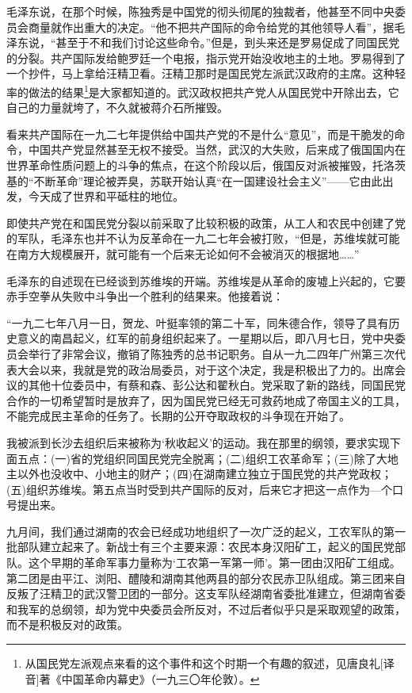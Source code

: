 \documentclass[10pt]{book}
\begin{document}
毛泽东说，在那个时候，陈独秀是中国党的彻头彻尾的独裁者，他甚至不同中央委员会商量就作出重大的决定。“他不把共产国际的命令给党的其他领导人看”，据毛泽东说，“甚至于不和我们讨论这些命令。”但是，到头来还是罗易促成了同国民党的分裂。共产国际发给鲍罗廷一个电报，指示党开始没收地主的土地。罗易得到了一个抄件，马上拿给汪精卫看。汪精卫那时是国民党左派武汉政府的主席。这种轻率的做法的结果\footnote{从国民党左派观点来看的这个事件和这个时期一个有趣的叙述，见唐良礼[译音]著《中国革命内幕史》（一九三〇年伦敦）。}是大家都知道的。武汉政权把共产党人从国民党中开除出去，它自己的力量就垮了，不久就被蒋介石所摧毁。

看来共产国际在一九二七年提供给中国共产党的不是什么“意见”，而是干脆发的命令，中国共产党显然甚至无权不接受。当然，武汉的大失败，后来成了俄国国内在世界革命性质问题上的斗争的焦点，在这个阶段以后，俄国反对派被摧毁，托洛茨基的“不断革命”理论被弄臭，苏联开始认真“在一国建设社会主义”——它由此出发，今天成了世界和平砥柱的地位。

即使共产党在和国民党分裂以前采取了比较积极的政策，从工人和农民中创建了党的军队，毛泽东也并不认为反革命在一九二七年会被打败，“但是，苏维埃就可能在南方大规模展开，就可能有一个后来无论如何不会被消灭的根据地……”

毛泽东的自述现在已经谈到苏维埃的开端。苏维埃是从革命的废墟上兴起的，它要赤手空拳从失败中斗争出一个胜利的结果来。他接着说：

“一九二七年八月一日，贺龙、叶挺率领的第二十军，同朱德合作，领导了具有历史意义的南昌起义，红军的前身组织起来了。一星期以后，即八月七日，党中央委员会举行了非常会议，撤销了陈独秀的总书记职务。自从一九二四年广州第三次代表大会以来，我就是党的政治局委员，对于这个决定，我是积极出了力的。出席会议的其他十位委员中，有蔡和森、彭公达和翟秋白。党采取了新的路线，同国民党合作的一切希望暂时是放弃了，因为国民党已经无可救药地成了帝国主义的工具，不能完成民主革命的任务了。长期的公开夺取政权的斗争现在开始了。

我被派到长沙去组织后来被称为‘秋收起义’的运动。我在那里的纲领，要求实现下面五点：(一)省的党组织同国民党完全脱离；(二)组织工农革命军；(三)除了大地主以外也没收中、小地主的财产；(四)在湖南建立独立于国民党的共产党政权；(五)组织苏维埃。第五点当时受到共产国际的反对，后来它才把这一点作为—个口号提出来。

九月间，我们通过湖南的农会已经成功地组织了一次广泛的起义，工农军队的第一批部队建立起来了。新战士有三个主要来源：农民本身汉阳矿工，起义的国民党部队。这个早期的革命军事力量称为‘工农第一军第一师’。第一团由汉阳矿工组成。第二团是由平江、浏阳、醴陵和湖南其他两县的部分农民赤卫队组成。第三团来自反叛了汪精卫的武汉警卫团的一部分。这支军队经湖南省委批准建立，但湖南省委和我军的总纲领，却为党中央委员会所反对，不过后者似乎只是采取观望的政策，而不是积极反对的政策。
\end{document}
